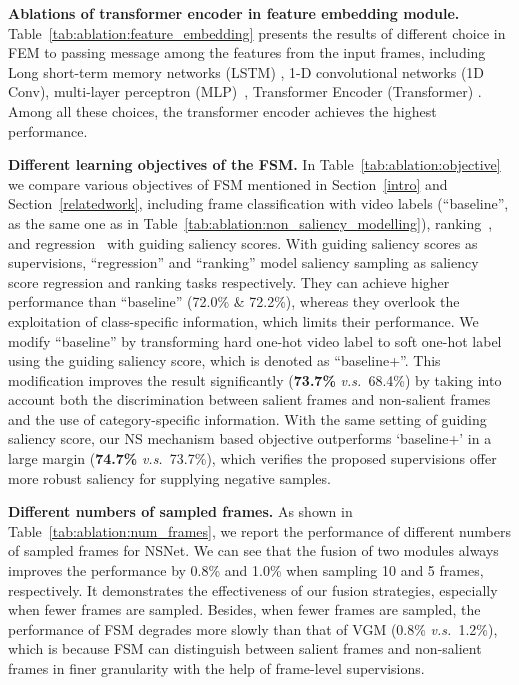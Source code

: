 \documentclass[runningheads]{llncs}
\newcommand{\tabref}[1]{Table~\ref{#1}}
\newcommand{\secref}[1]{Section~\ref{#1}}
\def\vs{\emph{v.s.~}}
\begin{document}
\noindent\textbf{Ablations of transformer encoder in feature embedding module.} 
\tabref{tab:ablation:feature_embedding} presents the results of different choice in FEM to passing message among the features from the input frames, including Long short-term memory networks (LSTM) \cite{lstm}, 1-D convolutional networks (1D Conv), multi-layer perceptron (MLP)~\cite{mlp}, Transformer Encoder (Transformer) \cite{transformer}.
Among all these choices, the transformer encoder achieves the highest performance.


\noindent\textbf{Different learning objectives of the FSM.}
In \tabref{tab:ablation:objective} we compare various objectives of FSM mentioned in \secref{intro} and \secref{relatedwork}, including frame classification with video labels (``baseline'', as the same one as in \tabref{tab:ablation:non_saliency_modelling}), ranking~\cite{scsampler19}, and regression~\cite{smart2020} with guiding saliency scores. 
With guiding saliency scores as supervisions, ``regression'' and ``ranking'' model saliency sampling as saliency score regression and ranking tasks respectively. They can achieve higher performance than ``baseline'' (72.0\% \& 72.2\%), whereas they overlook the exploitation of class-specific information, which limits their performance. We modify ``baseline'' by transforming hard one-hot video label to soft one-hot label using the guiding saliency score, which is denoted as ``baseline+''. This modification improves the result significantly (\textbf{73.7\%} \vs 68.4\%) by taking into account both the discrimination between salient frames and non-salient frames and the use of category-specific information. With the same setting of guiding saliency score, our NS mechanism based objective outperforms `baseline+' in a large margin (\textbf{74.7\%} \vs 73.7\%), which verifies the proposed supervisions offer more robust saliency for supplying negative samples. 




\noindent\textbf{Different numbers of sampled frames.}
As shown in \tabref{tab:ablation:num_frames}, we report the performance of different numbers of sampled frames for NSNet.
We can see that the fusion of two modules always improves the performance by 0.8\% and 1.0\% when sampling 10 and 5 frames, respectively. It demonstrates the effectiveness of our fusion strategies, especially when fewer frames are sampled. 
Besides, when fewer frames are sampled, the performance of FSM degrades more slowly than that of VGM (0.8\% \vs 1.2\%), which is because FSM can distinguish between salient frames and non-salient frames in finer granularity with the help of frame-level supervisions.
\end{document}
